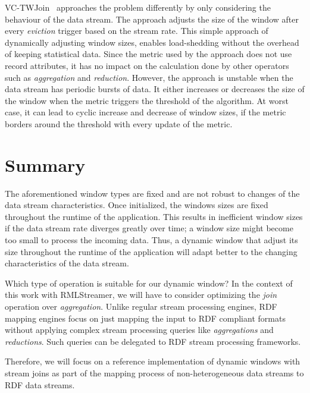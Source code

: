 VC-TWJoin~\cite{vctw_join} approaches the problem differently by only considering 
the behaviour of the data stream. The approach adjusts the size of the window 
after every \emph{eviction} trigger based on the stream rate. This simple approach 
of dynamically adjusting window sizes, enables load-shedding without the overhead of 
keeping statistical data. Since the metric used by the approach does not use 
record attributes, it has no impact on the calculation 
done by other operators such as \emph{aggregation} and \emph{reduction}.
However, the approach is unstable when the data stream has periodic bursts of data.
It either increases or decreases the size of the window when the metric triggers 
the threshold of the algorithm. At worst case, it can lead to cyclic increase and 
decrease of window sizes, if the metric borders around the threshold with every 
update of the metric.


\section{Summary}%
\label{sec:Summary}

The aforementioned window types are fixed and are not robust to changes of the data stream characteristics. Once initialized, the windows sizes 
are fixed throughout the runtime of the application. This results in inefficient 
window sizes if the data stream rate diverges greatly over time; a window size might become too small to process the incoming 
data. Thus, a dynamic window that adjust its size throughout the runtime of the application 
will adapt better to the changing characteristics of the data stream. 


Which type of operation is suitable for our dynamic window? 
In the context of this work with RMLStreamer, we will have to consider optimizing the 
\emph{join} operation over \emph{aggregation}. 
Unlike regular stream processing engines, RDF mapping engines focus 
on just mapping the input to RDF compliant formats without 
applying complex stream processing queries like \emph{aggregations} and 
\emph{reductions}. Such queries can be 
delegated to RDF stream processing frameworks.

Therefore, we will focus on a reference implementation of dynamic windows with 
stream joins as part of the mapping process of non-heterogeneous data streams 
to RDF data streams. 



